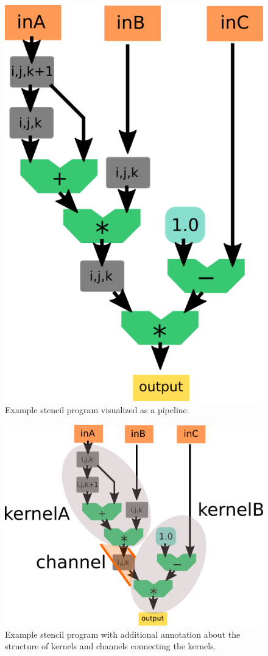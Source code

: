 \begin{figure}[h]
	\centering
	\includegraphics[width=1.0\textwidth]{drawings/approach-stencil-program-pipeline.png}
	\caption{Example stencil program visualized as a pipeline.}
	\label{fig:mesh1}
\end{figure}

\begin{figure}[h]
	\centering
	\includegraphics[width=1.0\textwidth]{drawings/approach-stencil-program-pipeline-annotated.png}
	\caption{Example stencil program with additional annotation about the structure of kernels and channels connecting the kernels.}
	\label{fig:mesh1}
\end{figure}